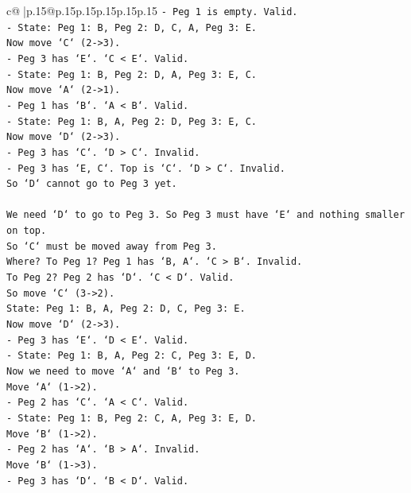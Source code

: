 \documentclass{article}
\begin{document}
{\begin{supertabular}{c@{$\;$}|p{.15\linewidth}@{}p{.15\linewidth}p{.15\linewidth}p{.15\linewidth}p{.15\linewidth}p{.15\linewidth}}
{{{\texttt{{-} Peg 1 is empty. Valid.} \\
\texttt{{-} State: Peg 1: B, Peg 2: D, C, A, Peg 3: E.} \\
\texttt{Now move `C` (2{-}>3).} \\
\texttt{{-} Peg 3 has `E`. `C < E`. Valid.} \\
\texttt{{-} State: Peg 1: B, Peg 2: D, A, Peg 3: E, C.} \\
\texttt{Now move `A` (2{-}>1).} \\
\texttt{{-} Peg 1 has `B`. `A < B`. Valid.} \\
\texttt{{-} State: Peg 1: B, A, Peg 2: D, Peg 3: E, C.} \\
\texttt{Now move `D` (2{-}>3).} \\
\texttt{{-} Peg 3 has `C`. `D > C`. Invalid.} \\
\texttt{{-} Peg 3 has `E, C`. Top is `C`. `D > C`. Invalid.} \\
\texttt{So `D` cannot go to Peg 3 yet.} \\
\\ 
\texttt{We need `D` to go to Peg 3. So Peg 3 must have `E` and nothing smaller on top.} \\
\texttt{So `C` must be moved away from Peg 3.} \\
\texttt{Where? To Peg 1? Peg 1 has `B, A`. `C > B`. Invalid.} \\
\texttt{To Peg 2? Peg 2 has `D`. `C < D`. Valid.} \\
\texttt{So move `C` (3{-}>2).} \\
\texttt{State: Peg 1: B, A, Peg 2: D, C, Peg 3: E.} \\
\texttt{Now move `D` (2{-}>3).} \\
\texttt{{-} Peg 3 has `E`. `D < E`. Valid.} \\
\texttt{{-} State: Peg 1: B, A, Peg 2: C, Peg 3: E, D.} \\
\texttt{Now we need to move `A` and `B` to Peg 3.} \\
\texttt{Move `A` (1{-}>2).} \\
\texttt{{-} Peg 2 has `C`. `A < C`. Valid.} \\
\texttt{{-} State: Peg 1: B, Peg 2: C, A, Peg 3: E, D.} \\
\texttt{Move `B` (1{-}>2).} \\
\texttt{{-} Peg 2 has `A`. `B > A`. Invalid.} \\
\texttt{Move `B` (1{-}>3).} \\
\texttt{{-} Peg 3 has `D`. `B < D`. Valid.} \\
}}}
\end{supertabular}}
\end{document}
